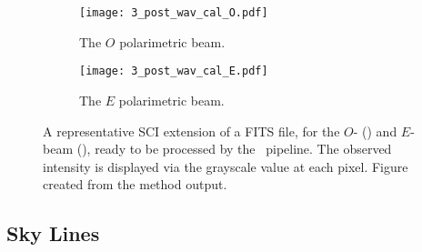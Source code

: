 \begin{figure}[t]
    \centering
    \begin{subfigure}[b]{1.0 \textwidth}
        \centering
        \texttt{[image: 3\_post\_wav\_cal\_O.pdf]}
        \caption{The $O$ polarimetric beam.}
        \label{subfig:post_wav_O}
    \end{subfigure}
    \centering
    \begin{subfigure}[b]{1.0\textwidth}
        \centering
        \texttt{[image: 3\_post\_wav\_cal\_E.pdf]}
        \caption{The $E$ polarimetric beam.}
        \label{subfig:post_wav_E}
    \end{subfigure}
    \caption{A representative \gls{SCI} extension of a \gls{FITS} file, for the $O$- () and $E$-beam (), ready to be processed by the \polsalt\ pipeline. The observed intensity is displayed via the grayscale value at each pixel. Figure created from the  method output.}
    \label{fig:polsalt_post_wav_cal}
\end{figure}

\subsection{Sky Lines} \label{subsec:stops_skyline}



